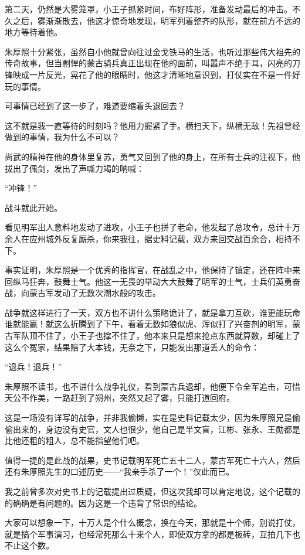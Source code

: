 \begin{multicols}{\theparacolNo}
		第二天，仍然是大雾笼罩，小王子抓紧时间，布好阵形，准备发动最后的冲击。不久之后，雾渐渐散去，他这才惊奇地发现，明军列着整齐的队形，就在前方不远的地方等待着他。

		朱厚照十分紧张，虽然自小他就曾向往过金戈铁马的生活，也听过那些伟大祖先的传奇故事，但当剽悍的蒙古骑兵真正出现在他的面前，叫嚣声不绝于耳，闪亮的刀锋映成一片反光，晃花了他的眼睛时，他这才清晰地意识到，打仗实在不是一件好玩的事情。

		可事情已经到了这一步了，难道要缩着头退回去？

		这不就是我一直等待的时刻吗？他用力握紧了手。横扫天下，纵横无敌！先祖曾经做到的事情，我为什么不可以？

		尚武的精神在他的身体里复苏，勇气又回到了他的身上，在所有士兵的注视下，他拔出了佩剑，发出了声嘶力竭的呐喊：

		“冲锋！”

		战斗就此开始。

		看见明军出人意料地发动了进攻，小王子也拼了老命，他发起了总攻令，总计十万余人在应州城外反复厮杀，你来我往，据史料记载，双方来回交战百余合，相持不下。

		事实证明，朱厚照是一个优秀的指挥官，在战乱之中，他保持了镇定，还在阵中来回纵马狂奔，鼓舞士气。他这一无畏的举动大大鼓舞了明军的士气，士兵们英勇奋战，向蒙古军发动了无数次潮水般的攻击。

		战争就这样进行了一天，双方也不讲什么策略诡计了，就是拿刀互砍，谁更能玩命谁就能赢！就这么折腾到了下午，看着无数如狼似虎、浑似打了兴奋剂的明军，蒙古军队顶不住了，小王子也撑不住了，他本来只是想来抢点东西就算数，却碰上了这么个冤家，结果赔了大本钱，无奈之下，只能发出那道丢人的命令：

		“退兵！退兵！”

		朱厚照不读书，也不讲什么战争礼仪，看到蒙古兵退却，他便下令全军追击，可惜天公不作美，一路赶到了朔州，突然又起了雾，只能打道回府。

		这是一场没有详写的战争，并非我偷懒，实在是史料记载太少，因为朱厚照兄是偷偷出来的，身边没有史官，文人也很少，他自己是半文盲，江彬、张永、王勋都是比他还粗的粗人，总不能指望他们吧。

		值得一提的是此战的战果，史书记载明军死亡五十二人，蒙古军死亡十六人，然后还有朱厚照先生的口述历史——“我亲手杀了一个！”仅此而已。

		我之前曾多次对史书上的记载提出过质疑，但这次我却可以肯定地说，这个记载的的确确是有问题的。因为这是一个违背了常识的结论。

		大家可以想象一下，十万人是个什么概念，换在今天，那就是十个师，别说打仗，就是搞个军事演习，也经常死那么十来个人，即使双方拿的都是板砖，互拍几下也不止这个数。


\end{multicols}
